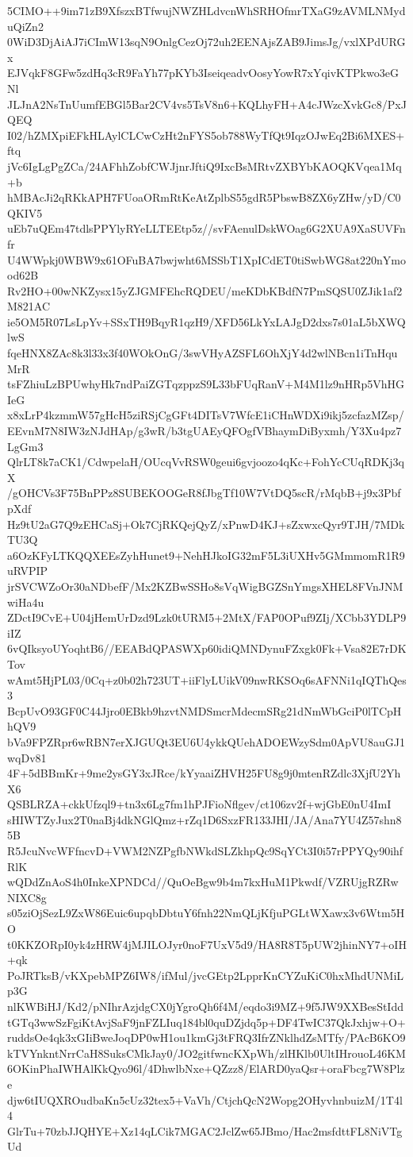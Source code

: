 5CIMO++9im71zB9XfszxBTfwujNWZHLdvcnWhSRHOfmrTXaG9zAVMLNMyduQiZn2
0WiD3DjAiAJ7iCImW13sqN9OnlgCezOj72uh2EENAjsZAB9JimsJg/vxlXPdURGx
EJVqkF8GFw5zdHq3cR9FaYh77pKYb3IseiqeadvOosyYowR7xYqivKTPkwo3eGNl
JLJnA2NsTnUumfEBGl5Bar2CV4vs5TsV8n6+KQLhyFH+A4cJWzcXvkGc8/PxJQEQ
I02/hZMXpiEFkHLAylCLCwCzHt2nFYS5ob788WyTfQt9IqzOJwEq2Bi6MXES+ftq
jVc6IgLgPgZCa/24AFhhZobfCWJjnrJftiQ9IxcBsMRtvZXBYbKAOQKVqea1Mq+b
hMBAcJi2qRKkAPH7FUoaORmRtKeAtZplbS55gdR5PbswB8ZX6yZHw/yD/C0QKIV5
uEb7uQEm47tdlsPPYlyRYeLLTEEtp5z//svFAenulDskWOag6G2XUA9XaSUVFnfr
U4WWpkj0WBW9x61OFuBA7bwjwht6MSSbT1XpICdET0tiSwbWG8at220nYmood62B
Rv2HO+00wNKZysx15yZJGMFEhcRQDEU/meKDbKBdfN7PmSQSU0ZJik1af2M821AC
ie5OM5R07LsLpYv+SSxTH9BqyR1qzH9/XFD56LkYxLAJgD2dxs7s01aL5bXWQlwS
fqeHNX8ZAc8k3l33x3f40WOkOnG/3swVHyAZSFL6OhXjY4d2wlNBcn1iTnHquMrR
tsFZhiuLzBPUwhyHk7ndPaiZGTqzppzS9L33bFUqRanV+M4M1lz9nHRp5VhHGIeG
x8xLrP4kzmmW57gHcH5ziRSjCgGFt4DITsV7WfcE1iCHnWDXi9ikj5zcfazMZsp/
EEvnM7N8IW3zNJdHAp/g3wR/b3tgUAEyQFOgfVBhaymDiByxmh/Y3Xu4pz7LgGm3
QlrLT8k7aCK1/CdwpelaH/OUcqVvRSW0geui6gvjoozo4qKc+FohYcCUqRDKj3qX
/gOHCVs3F75BnPPz8SUBEKOOGeR8fJbgTf10W7VtDQ5scR/rMqbB+j9x3PbfpXdf
Hz9tU2aG7Q9zEHCaSj+Ok7CjRKQejQyZ/xPnwD4KJ+sZxwxcQyr9TJH/7MDkTU3Q
a6OzKFyLTKQQXEEsZyhHunet9+NehHJkoIG32mF5L3iUXHv5GMmmomR1R9uRVPIP
jrSVCWZoOr30aNDbefF/Mx2KZBwSSHo8sVqWigBGZSnYmgsXHEL8FVnJNMwiHa4u
ZDctI9CvE+U04jHemUrDzd9Lzk0tURM5+2MtX/FAP0OPuf9ZIj/XCbb3YDLP9iIZ
6vQIksyoUYoqhtB6//EEABdQPASWXp60idiQMNDynuFZxgk0Fk+Vsa82E7rDKTov
wAmt5HjPL03/0Cq+z0b02h723UT+iiFlyLUikV09nwRKSOq6sAFNNi1qIQThQes3
BcpUvO93GF0C44Jjro0EBkb9hzvtNMDSmcrMdecmSRg21dNmWbGciP0lTCpHhQV9
bVa9FPZRpr6wRBN7erXJGUQt3EU6U4ykkQUehADOEWzySdm0ApVU8auGJ1wqDv81
4F+5dBBmKr+9me2ysGY3xJRce/kYyaaiZHVH25FU8g9j0mtenRZdlc3XjfU2YhX6
QSBLRZA+ckkUfzql9+tn3x6Lg7fm1hPJFioNflgev/ct106zv2f+wjGbE0nU4ImI
sHIWTZyJux2T0naBj4dkNGlQmz+rZq1D6SxzFR133JHI/JA/Ana7YU4Z57shn85B
R5JcuNvcWFfncvD+VWM2NZPgfbNWkdSLZkhpQc9SqYCt3I0i57rPPYQy90ihfRlK
wQDdZnAoS4h0InkeXPNDCd//QuOeBgw9b4m7kxHuM1Pkwdf/VZRUjgRZRwNIXC8g
s05ziOjSezL9ZxW86Euic6upqbDbtuY6fnh22NmQLjKfjuPGLtWXawx3v6Wtm5HO
t0KKZORpI0yk4zHRW4jMJILOJyr0noF7UxV5d9/HA8R8T5pUW2jhinNY7+oIH+qk
PoJRTksB/vKXpebMPZ6IW8/ifMul/jvcGEtp2LpprKnCYZuKiC0hxMhdUNMiLp3G
nlKWBiHJ/Kd2/pNIhrAzjdgCX0jYgroQh6f4M/eqdo3i9MZ+9f5JW9XXBesStIdd
tGTq3wwSzFgiKtAvjSaF9jnFZLIuq184bl0quDZjdq5p+DF4TwIC37QkJxhjw+O+
ruddsOe4qk3xGIiBweJoqDP0wH1ou1kmGj3tFRQ3IfrZNklhdZsMTfy/PAcB6KO9
kTVYnkntNrrCaH8SuksCMkJay0/JO2gitfwncKXpWh/zlHKlb0UltIHrouoL46KM
6OKinPhaIWHAlKkQyo96l/4DhwlbNxe+QZzz8/ElARD0yaQsr+oraFbcg7W8Plze
djw6tIUQXROudbaKn5cUz32tex5+VaVh/CtjchQcN2Wopg2OHyvhnbuizM/1T4l4
GlrTu+70zbJJQHYE+Xz14qLCik7MGAC2JclZw65JBmo/Hac2msfdttFL8NiVTgUd
